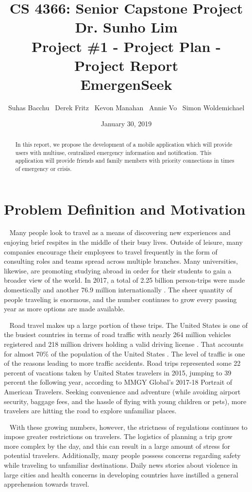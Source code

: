\documentclass[10pt, a4paper]{article}
\title{ \large CS 4366: Senior Capstone Project \\ Dr. Sunho Lim \\ Project \#1 - Project Plan - Project Report \\ EmergenSeek}
\author{Suhas Bacchu \ Derek Fritz \ Kevon Manahan \ Annie Vo \ Simon Woldemichael}
\date{January 30, 2019}
\begin{document}
\maketitle
\vspace{-1cm}
\begin{abstract}
In this report, we propose the development of a mobile application which will provide users with multiuse, centralized emergency information and notification. This application will provide friends and family members with priority connections in times of emergency or crisis.
\end{abstract}

\section{Problem Definition and Motivation}
\par ~ Many people look to travel as a means of discovering new experiences and enjoying brief respites in the middle of their busy lives. Outside of leisure, many companies encourage their employees to travel frequently in the form of consulting roles and teams spread across multiple branches. Many universities, likewise, are promoting studying abroad in order for their students to gain a broader view of the world. In 2017, a total of 2.25 billion person-trips were made domestically and another 76.9 million internationally \cite{one}. The sheer quantity of people traveling is enormous, and the number continues to grow every passing year as more options are made available.

\par ~ Road travel makes up a large portion of these trips. The United States is one of the busiest countries in terms of road traffic with nearly 264 million vehicles registered and 218 million drivers holding a valid driving license \cite{two}. That accounts for almost 70\% of the population of the United States  \cite{two}. The level of traffic is one of the reasons leading to more traffic accidents. Road trips represented some 22 percent of vacations taken by United States travelers in 2015, jumping to 39 percent the following year, according to MMGY Global’s 2017-18 Portrait of American Travelers. Seeking convenience and adventure (while avoiding airport security, baggage fees, and the hassle of flying with young children or pets), more travelers are hitting the road to explore unfamiliar places.

\par ~ With these growing numbers, however, the strictness of regulations continues to impose greater restrictions on travelers. The logistics of planning a trip grow more complex by the day, and this can result in a large amount of stress for potential travelers. Additionally, many people possess concerns regarding safety while traveling to unfamiliar destinations. Daily news stories about violence in large cities and health concerns in developing countries have instilled a general apprehension towards travel.
\end{document}
